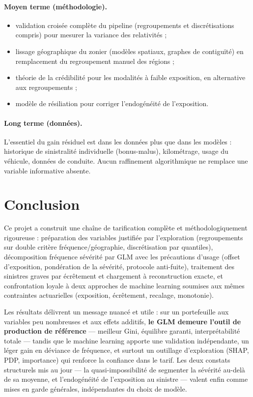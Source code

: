 \documentclass[11pt,a4paper]{article}
\begin{document}
\paragraph{Moyen terme (méthodologie).}
\begin{itemize}
    \item validation croisée complète du pipeline (regroupements et discrétisations compris) pour mesurer la variance des relativités ;
    \item lissage géographique du zonier (modèles spatiaux, graphes de contiguïté) en remplacement du regroupement manuel des régions ;
    \item théorie de la crédibilité pour les modalités à faible exposition, en alternative aux regroupements ;
    \item modèle de résiliation pour corriger l'endogénéité de l'exposition.
\end{itemize}

\paragraph{Long terme (données).} L'essentiel du gain résiduel est dans les données plus que dans les modèles : historique de sinistralité individuelle (bonus-malus), kilométrage, usage du véhicule, données de conduite. Aucun raffinement algorithmique ne remplace une variable informative absente.

\section{Conclusion}

Ce projet a construit une chaîne de tarification complète et méthodologiquement rigoureuse : préparation des variables justifiée par l'exploration (regroupements sur double critère fréquence/géographie, discrétisation par quantiles), décomposition fréquence \texttimes{} sévérité par GLM avec les précautions d'usage (offset d'exposition, pondération de la sévérité, protocole anti-fuite), traitement des sinistres graves par écrêtement et chargement à reconstruction exacte, et confrontation loyale à deux approches de machine learning soumises aux mêmes contraintes actuarielles (exposition, écrêtement, recalage, monotonie).

Les résultats délivrent un message nuancé et utile : sur un portefeuille aux variables peu nombreuses et aux effets additifs, \textbf{le GLM demeure l'outil de production de référence} --- meilleur Gini, équilibre garanti, interprétabilité totale --- tandis que le machine learning apporte une validation indépendante, un léger gain en déviance de fréquence, et surtout un outillage d'exploration (SHAP, PDP, importance) qui renforce la confiance dans le tarif. Les deux constats structurels mis au jour --- la quasi-impossibilité de segmenter la sévérité au-delà de sa moyenne, et l'endogénéité de l'exposition au sinistre --- valent enfin comme mises en garde générales, indépendantes du choix de modèle.
\end{document}
